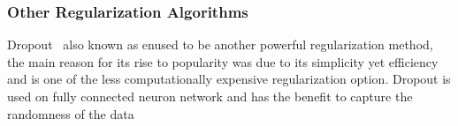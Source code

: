 \subsubsection{Other Regularization Algorithms}

Dropout~\cite{JMLR:v15:srivastava14a} also known as enused to be another powerful regularization method, the main reason for its rise to popularity was due to its simplicity yet efficiency and is one of the less computationally expensive regularization option. Dropout is used on fully connected neuron network and has the benefit to capture the randomness of the data